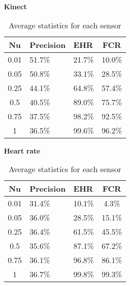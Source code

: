 \begin{table}[h]
  \textbf{Kinect}\vspace{2pt}
  \begin{tabularx}{\columnwidth}{cXXc}
    \toprule
    \textbf{Nu} & \textbf{Precision} & \textbf{EHR} & \textbf{FCR} \\
    \midrule
    0.01        & 51.7\%             & 21.7\%       & 10.0\%       \\ \hline
    0.05        & 50.8\%             & 33.1\%       & 28.5\%       \\ \hline
    0.25        & 44.1\%             & 64.8\%       & 57.4\%       \\ \hline
    0.5         & 40.5\%             & 89.0\%       & 75.7\%       \\ \hline
    0.75        & 37.5\%             & 98.2\%       & 92.5\%       \\ \hline
    1           & 36.5\%             & 99.6\%       & 96.2\%       \\ \hline
    \bottomrule
  \end{tabularx}

  \vspace{4pt}

  \textbf{Heart rate}\vspace{2pt}
  \begin{tabularx}{\columnwidth}{cXXc}
    \toprule
    \textbf{Nu} & \textbf{Precision} & \textbf{EHR} & \textbf{FCR} \\
    \midrule
    0.01        & 31.4\%             & 10.1\%       & 4.3\%        \\ \hline
    0.05        & 36.0\%             & 28.5\%       & 15.1\%       \\ \hline
    0.25        & 36.4\%             & 61.5\%       & 45.5\%       \\ \hline
    0.5         & 35.6\%             & 87.1\%       & 67.2\%       \\ \hline
    0.75        & 36.1\%             & 96.8\%       & 86.1\%       \\ \hline
    1           & 36.7\%             & 99.8\%       & 99.3\%       \\ \hline
    \bottomrule
  \end{tabularx}

  \caption{Average statistics for each sensor}
  \label{[TABLE]_avg_stats_sensors}
\end{table}